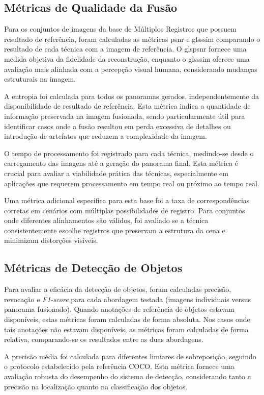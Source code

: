 \subsection{Métricas de Qualidade da Fusão}

Para os conjuntos de imagens da base de Múltiplos Registros que possuem resultado de referência, foram calculadas as métricas \gls{psnr} e gls{ssim} comparando o resultado de cada técnica com a imagem de referência. O gls{psnr} fornece uma medida objetiva da fidelidade da reconstrução, enquanto o gls{ssim} oferece uma avaliação mais alinhada com a percepção visual humana, considerando mudanças estruturais na imagem.

A entropia foi calculada para todos os panoramas gerados, independentemente da disponibilidade de resultado de referência. Esta métrica indica a quantidade de informação preservada na imagem fusionada, sendo particularmente útil para identificar casos onde a fusão resultou em perda excessiva de detalhes ou introdução de artefatos que reduzem a complexidade da imagem.

O tempo de processamento foi registrado para cada técnica, medindo-se desde o carregamento das imagens até a geração do panorama final. Esta métrica é crucial para avaliar a viabilidade prática das técnicas, especialmente em aplicações que requerem processamento em tempo real ou próximo ao tempo real.

Uma métrica adicional específica para esta base foi a taxa de correspondências corretas em cenários com múltiplas possibilidades de registro. Para conjuntos onde diferentes alinhamentos são válidos, foi avaliado se a técnica consistentemente escolhe registros que preservam a estrutura da cena e minimizam distorções visíveis.

\subsection{Métricas de Detecção de Objetos}

Para avaliar a eficácia da detecção de objetos, foram calculadas precisão, revocação e \textit{F1-score} para cada abordagem testada (imagens individuais versus panorama fusionado). Quando anotações de referência de objetos estavam disponíveis, estas métricas foram calculadas de forma absoluta. Nos casos onde tais anotações não estavam disponíveis, as métricas foram calculadas de forma relativa, comparando-se os resultados entre as duas abordagens.

A precisão média foi calculada para diferentes limiares de sobreposição, seguindo o protocolo estabelecido pela referência COCO. Esta métrica fornece uma avaliação robusta do desempenho do sistema de detecção, considerando tanto a precisão na localização quanto na classificação dos objetos.

